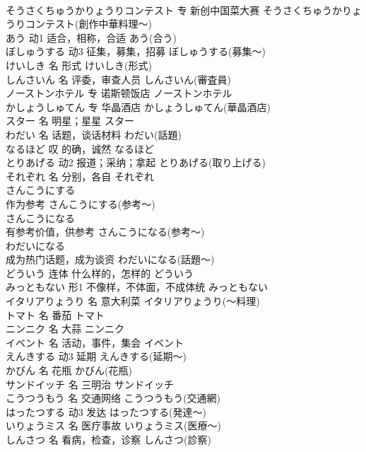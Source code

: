 \documentclass[8pt]{extreport}
\begin{document}
\begin{CJK}{UTF8}{min}
\\	そうさくちゅうかりょうりコンテスト	专	新创中国菜大赛	そうさくちゅうかりょうりコンテスト(創作中華料理～)	
\\	あう	动1	适合，相称，合适	あう(合う)	
\\	ぼしゅうする	动3	征集，募集，招募	ぼしゅうする(募集～)	
\\	けいしき	名	形式	けいしき(形式)	
\\	しんさいん	名	评委，审查人员	しんさいん(審査員)	
\\	ノーストンホテル	专	诺斯顿饭店	ノーストンホテル	
\\	かしょうしゅてん	专	华晶酒店	かしょうしゅてん(華晶酒店)	
\\	スター	名	明星；星星	スター	
\\	わだい	名	话题，谈话材料	わだい(話題)	
\\	なるほど	叹	的确，诚然	なるほど	
\\	とりあげる	动2	报道；采纳；拿起	とりあげる(取り上げる)	
\\	それぞれ	名	分别，各自	それぞれ	
\\	さんこうにする	
\\	作为参考	さんこうにする(参考～)	
\\	さんこうになる	
\\	有参考价值，供参考	さんこうになる(参考～)	
\\	わだいになる	
\\	成为热门话题，成为谈资	わだいになる(話題～)	
\\	どういう	连体	什么样的，怎样的	どういう	
\\	みっともない	形1	不像样，不体面，不成体统	みっともない	
\\	イタリアりょうり	名	意大利菜	イタリアりょうり(～料理)	
\\	トマト	名	番茄	トマト	
\\	ニンニク	名	大蒜	ニンニク	
\\	イベント	名	活动，事件，集会	イベント	
\\	えんきする	动3	延期	えんきする(延期～)	
\\	かびん	名	花瓶	かびん(花瓶)	
\\	サンドイッチ	名	三明治	サンドイッチ	
\\	こうつうもう	名	交通网络	こうつうもう(交通網)	
\\	はったつする	动3	发达	はったつする(発達～)	
\\	いりょうミス	名	医疗事故	いりょうミス(医療～)	
\\	しんさつ	名	看病，检查，诊察	しんさつ(診察)	

\end{CJK}
\end{document}
